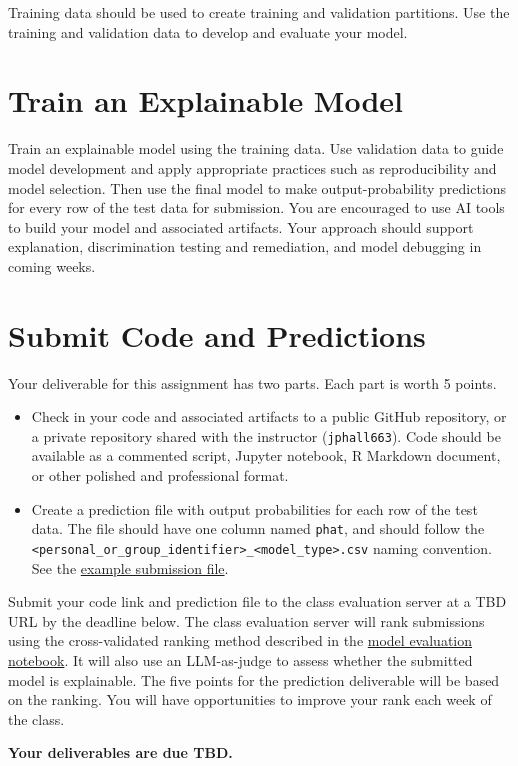 \documentclass[fleqn]{article}
\begin{document}
\noindent Training data should be used to create training and validation partitions. Use the training and validation data to develop and evaluate your model.

\section{Train an Explainable Model}

Train an explainable model using the training data. Use validation data to guide model development and apply appropriate practices such as reproducibility and model selection. Then use the final model to make output-probability predictions for every row of the test data for submission. You are encouraged to use AI tools to build your model and associated artifacts. Your approach should support explanation, discrimination testing and remediation, and model debugging in coming weeks.

\section{Submit Code and Predictions}

Your deliverable for this assignment has two parts. Each part is worth 5 points.

\begin{itemize}
	\item Check in your code and associated artifacts to a public GitHub repository, or a private repository shared with the instructor (\texttt{jphall663}). Code should be available as a commented script, Jupyter notebook, R Markdown document, or other polished and professional format.
	\item Create a prediction file with output probabilities for each row of the test data. The file should have one column named \texttt{phat}, and should follow the \texttt{<personal\_or\_group\_identifier>\_<model\_type>.csv} naming convention. See the \href{https://github.com/jphall663/GWU_rml/blob/master/assignment/assignment\_1/ph\_glm.csv}{example submission file}.
\end{itemize}

Submit your code link and prediction file to the class evaluation server at a TBD URL by the deadline below. The class evaluation server will rank submissions using the cross-validated ranking method described in the \href{https://github.com/jphall663/GWU_rml/blob/master/assignment/eval.ipynb}{model evaluation notebook}. It will also use an LLM-as-judge to assess whether the submitted model is explainable. The five points for the prediction deliverable will be based on the ranking. You will have opportunities to improve your rank each week of the class.

\vspace{\baselineskip}
\noindent \textbf{Your deliverables are due TBD.}
\end{document}
